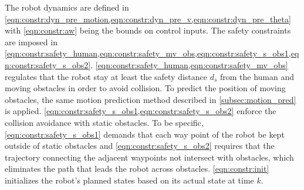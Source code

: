 \documentclass[journal]{IEEEtran}
\begin{document}
	The robot dynamics are defined in \cref{eqn:constr:dyn_pre_motion,eqn:constr:dyn_pre_v,eqn:constr:dyn_pre_theta} with \cref{eqn:constr:aw} being the bounds on control inputs.
	The safety constraints are imposed in \cref{eqn:constr:safety_human,eqn:constr:safety_mv_obs,eqn:constr:safety_s_obs1,eqn:constr:safety_s_obs2}.
	\cref{eqn:constr:safety_human,eqn:constr:safety_mv_obs} regulates that the robot stay at least the safety distance $d_s$ from the human and moving obstacles in order to avoid collision.
	To predict the position of moving obstacles, the same motion prediction method described in \cref{subsec:motion_pred} is applied.
	\cref{eqn:constr:safety_s_obs1,eqn:constr:safety_s_obs2} enforce the collision avoidance with static obstacles.
	To be specific, \cref{eqn:constr:safety_s_obs1} demands that each way point of the robot be kept outside of static obstacles and	\cref{eqn:constr:safety_s_obs2} requires that the trajectory connecting the adjacent waypoints not intersect with obstacles, which eliminates the path that leads the robot across obstacles.
	\cref{eqn:constr:init} initializes the robot's planned states based on its actual state at time $k$.
	
\end{document}
